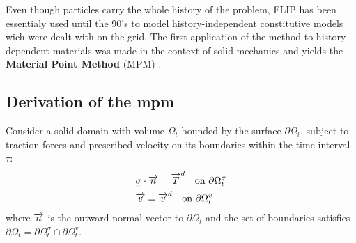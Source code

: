 Even though particles carry the whole history of the problem, FLIP has been essentialy used until the 90's to model history-independent constitutive models wich were dealt with on the grid. The first application of the method to history-dependent materials was made in the context of solid mechanics and yields the \textbf{Material Point Method} (MPM) \cite{Sulsky94}. %

\subsection{Derivation of the mpm}
Consider a solid domain with volume $\Omega_t$ bounded by the surface $\partial \Omega_t$, subject to traction forces and prescribed velocity on its boundaries within the time interval $\tau$:
\begin{align}
  & {\underline{\underline{\sigma}}}\cdot{\overrightarrow{n}}={\overrightarrow{T}}^d \quad \text{on } \partial \Omega_t^\sigma\\
  & {\overrightarrow{v}} = {\overrightarrow{v}}^d \quad \text{on } \partial \Omega_t^v
\end{align}
where ${\overrightarrow{n}}$ is the outward normal vector to $\partial \Omega_t$ and the set of boundaries satisfies $\partial \Omega_t =\partial \Omega^\sigma_t \cap \partial \Omega^v_t$.


